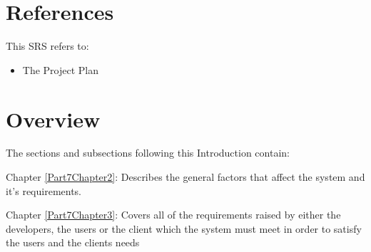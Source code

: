 
\section{References}

This SRS refers to:

\begin{itemize}
	\item The Project Plan
\end{itemize}

\section{Overview}

The sections and subsections following this Introduction contain:

Chapter \ref{Part7Chapter2}:  Describes the general factors that affect the system and it's requirements.

Chapter \ref{Part7Chapter3}:  Covers all of the requirements raised by either the developers, the users or the client which the system must meet in order to satisfy the users and the clients needs


